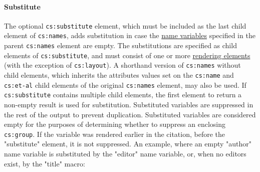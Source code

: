 \hypertarget{substitute}{%
\paragraph{Substitute}\label{substitute}}

The optional \texttt{cs:substitute} element, which must be included as
the last child element of \texttt{cs:names}, adds substitution in case
the \protect\hyperlink{name-variables}{name variables} specified in the
parent \texttt{cs:names} element are empty. The substitutions are
specified as child elements of \texttt{cs:substitute}, and must consist
of one or more \protect\hyperlink{rendering-elements}{rendering
elements} (with the exception of \texttt{cs:layout}). A shorthand
version of \texttt{cs:names} without child elements, which inherits the
attributes values set on the \texttt{cs:name} and \texttt{cs:et-al}
child elements of the original \texttt{cs:names} element, may also be
used. If \texttt{cs:substitute} contains multiple child elements, the
first element to return a non-empty result is used for substitution.
Substituted variables are suppressed in the rest of the output to
prevent duplication. Substituted variables are considered empty for the
purposes of determining whether to suppress an enclosing
\texttt{cs:group}. If the variable was rendered earlier in the citation,
before the "substitute" element, it is not suppressed. An example, where
an empty "author" name variable is substituted by the "editor" name
variable, or, when no editors exist, by the "title" macro:

\begin{Shaded}
\begin{Highlighting}[]
\NormalTok{\textless{}}\NormalTok{\textgreater{}}
\NormalTok{  \textless{}}\NormalTok{\textgreater{}}
\NormalTok{    \textless{}}\NormalTok{\textgreater{}}
\NormalTok{      \textless{}}\NormalTok{/\textgreater{}}
\NormalTok{      \textless{}}\NormalTok{/\textgreater{}}
\NormalTok{    \textless{}/}\NormalTok{\textgreater{}}
\NormalTok{  \textless{}/}\NormalTok{\textgreater{}}
\NormalTok{\textless{}/}\NormalTok{\textgreater{}}
\end{Highlighting}
\end{Shaded}

